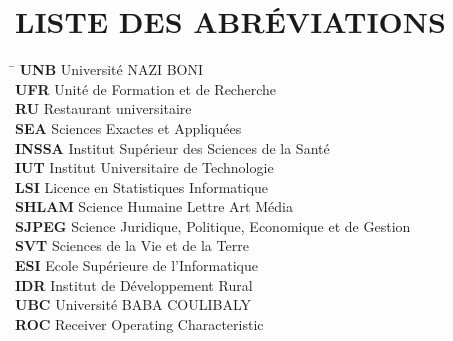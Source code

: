 \documentclass[
12pt,          %
a4paper,       %
oneside,      %
openright      %
]{report}          %
\begin{document}
		\cleardoublepage
		
		
		\chapter*{LISTE DES ABR\'EVIATIONS}
		
		\begin{tabbing}
			\hspace{4cm} \= \kill   %
			\textbf{UNB}  \> Université NAZI BONI \\[3pt]
			\textbf{UFR}    \> Unité de Formation et de Recherche \\[3pt]
			\textbf{RU}   \> Restaurant universitaire \\[3pt]
			\textbf{SEA}   \> Sciences Exactes et Appliquées  \\[3pt]
			\textbf{INSSA}   \> Institut Supérieur des Sciences de la Santé \\[3pt]
			\textbf{IUT}   \>  Institut Universitaire de Technologie \\[3pt]
			\textbf{LSI}   \>  Licence en Statistiques Informatique \\[3pt]
			\textbf{SHLAM}   \>  Science Humaine Lettre Art Média\\[3pt]
			\textbf{SJPEG}   \> Science Juridique, Politique, Economique et de Gestion \\[3pt]
			\textbf{SVT}   \>  Sciences de la Vie et de la Terre \\[3pt]
			\textbf{ESI}   \>  Ecole Supérieure de l'Informatique \\[3pt]
			\textbf{IDR}   \>  Institut de Développement Rural \\[3pt]
			\textbf{UBC}   \>  Université BABA COULIBALY \\[3pt]
			\textbf{ROC}   \>  Receiver Operating Characteristic \\[3pt]
			
		\end{tabbing}
		
		\cleardoublepage
		
		\listoftables
		\cleardoublepage
		
		\listoffigures
		\cleardoublepage
	
\end{document}
